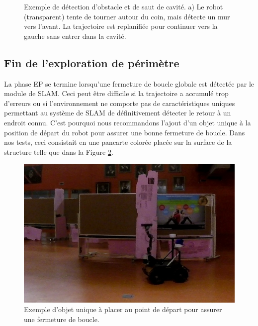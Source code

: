\begin{figure}[ht]
\centering
{}
\hfil
{}
\caption{
Exemple de détection d'obstacle et de saut de cavité. a) Le robot (transparent) tente de tourner autour du coin, mais détecte un mur vers l'avant. La trajectoire est replanifiée pour continuer vers la gauche sans entrer dans la cavité.}
\label{fig:ugv_exploration}
\end{figure}

\subsection{Fin de l'exploration de périmètre}

La phase EP se termine lorsqu'une fermeture de boucle globale est détectée par le module de SLAM. Ceci peut être difficile si la trajectoire a accumulé trop d'erreurs ou si l'environnement ne comporte pas de caractéristiques uniques permettant au système de SLAM de définitivement détecter le retour à un endroit connu. C'est pourquoi nous recommandons l'ajout d'un objet unique à la position de départ du robot pour assurer une bonne fermeture de boucle. Dans nos tests, ceci consistait en une pancarte colorée placée sur la surface de la structure telle que dans la Figure \ref{fig:ugv_pancarte}.

\begin{figure}[ht]
  \centering
  \includegraphics[width=0.5\linewidth]{images/ugv_unique.jpg}
  \caption{Exemple d'objet unique à placer au point de départ pour assurer une fermeture de boucle.}
  \label{fig:ugv_pancarte}
\end{figure}

